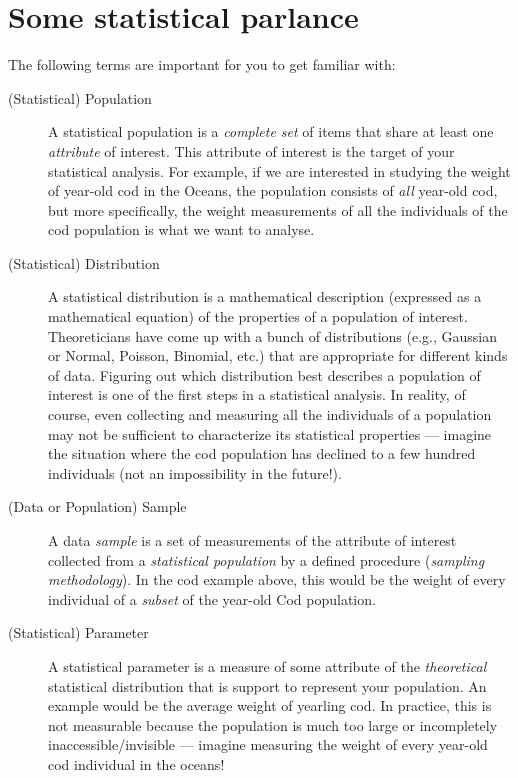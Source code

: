 \section{Some statistical parlance}
The following terms are important for you to get familiar with:
\begin{description}
    
		\item[(Statistical) Population] A statistical population is a {\it 
		complete set} of items that share at least one {\it attribute} of 
		interest. This attribute of interest is the target of your 
		statistical analysis. For example, if we are interested in studying 
		the weight of year-old cod in the Oceans, the population 
		consists of {\it all} year-old cod, but more specifically, the 
		weight measurements of all the individuals of the cod population is 
		what we want to analyse. 
    
		\item[(Statistical) Distribution] A statistical distribution is a 
		mathematical description (expressed as a mathematical equation) of 
		the properties of a population of interest. Theoreticians have come 
		up with a bunch of distributions (e.g., Gaussian or Normal, 
		Poisson, Binomial, etc.) that are appropriate for different kinds 
		of data. Figuring out which distribution best describes a 
		population of interest is one of the first steps in a statistical 
		analysis. In reality, of course, even collecting and measuring all 
		the individuals of a population may not be sufficient to 
		characterize its statistical properties --- imagine the situation 
		where the cod population has declined to a few hundred individuals 
		(not an impossibility in the future!).
    
		\item[(Data or Population) Sample] A data {\it sample} is a set of 
		measurements of the attribute of interest collected from a {\it 
		statistical population} by a defined procedure ({\it sampling 
		methodology}). In the cod example above, this would be the weight 
		of every individual of a {\it subset} of the year-old Cod 
		population.

		\item[(Statistical) Parameter]  A statistical parameter is a 
		measure of some attribute of the {\it theoretical} statistical 
		distribution that is support to represent your population. An 
		example would be the average weight of yearling cod. In 
		practice, this is not measurable because the population is much too 
		large or incompletely inaccessible/invisible --- imagine measuring 
		the weight of every year-old cod individual in the oceans!   


\end{description}
